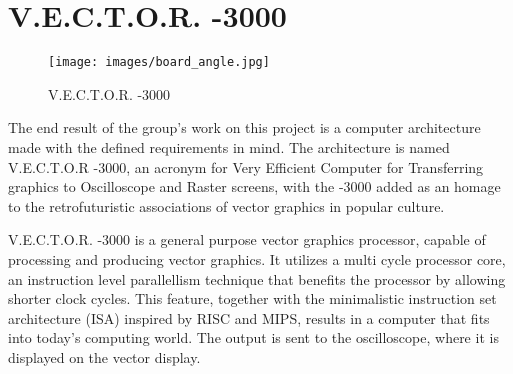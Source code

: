 \chapter{V.E.C.T.O.R. -3000}

\begin{figure}[H]
    \texttt{[image: images/board\_angle.jpg]}
    \caption{V.E.C.T.O.R. -3000}
    \label{fig:board-angle}
\end{figure}

The end result of the group's work on this project is a computer architecture made with the defined requirements in mind.
The architecture is named V.E.C.T.O.R -3000, an acronym for Very Efficient Computer for Transferring graphics to Oscilloscope and Raster screens, with the -3000 added as an homage to the retrofuturistic associations of vector graphics in popular culture.

V.E.C.T.O.R. -3000 is a general purpose vector graphics processor, capable of processing and producing vector graphics. 
It utilizes a multi cycle processor core, an instruction level parallellism technique that benefits the processor by allowing shorter clock cycles.
This feature, together with the minimalistic instruction set architecture (ISA) inspired by RISC\cite{} and MIPS\cite{}, results in a computer that fits into today's computing world.
The output is sent to the oscilloscope, where it is displayed on the vector display.
